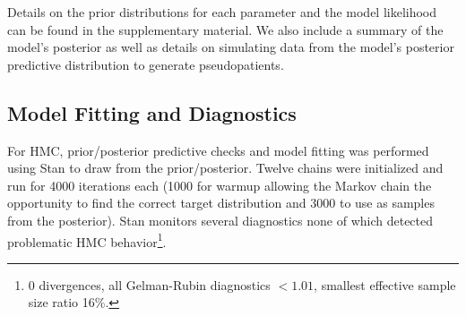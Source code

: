 %
%
%
%

Details on the prior distributions for each parameter and the model likelihood can be found in the supplementary material.  We also include a summary of the model's posterior as well as details on simulating data from the model's posterior predictive distribution to generate pseudopatients.

\subsection*{Model Fitting and Diagnostics}

For HMC, prior/posterior predictive checks and model fitting was performed using Stan \citep{Carpenter2017-qf} to draw from the prior/posterior.  Twelve chains were initialized and run for 4000 iterations each (1000 for warmup allowing the Markov chain the opportunity to find the correct target distribution and 3000 to use as samples from the posterior). Stan monitors several diagnostics none of which detected problematic HMC behavior\footnote{0 divergences, all Gelman-Rubin diagnostics $<1.01$, smallest effective sample size ratio 16\%.}.

